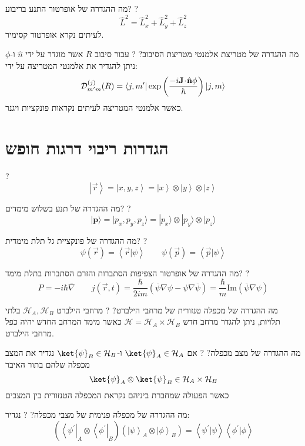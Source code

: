 \documentclass{tstextbook}
\begin{document}
מה ההגדרה של אופרטור התנע בריבוע?
?
$$\hat{L}^{2}=\hat{L}_{x}^{2}+\hat{L}_{y}^{2}+\hat{L}_{z}^{2}$$
לעיתים נקרא אופרטור קסימיר.

מה ההגדרה של מטריצת אלמנטי מטריצת הסיבוב?
?
עבור סיבוב \(R\) אשר מוגדר על ידי \(\hat{n}\) ו-\(\phi\) ניתן להגדיר את אלמנטי המטריצה על ידי:
$${\mathcal{D}}_{m^{\prime}m}^{(j)}(R)=\langle j,m^{\prime}|\exp\left(\frac{-i{\bf J}\!\cdot\!{\hat{\bf n}}\phi}{\hbar}\right)|j,m\rangle$$
כאשר אלמנטי המטריצה לעיתים נקראות פונקציות ויגנר.

\section{הגדרות ריבוי דרגות חופש}

?
$$\left|\vec{r}\right\rangle=\left|x,y,z\right\rangle=\left|x\right\rangle\otimes\left|y\right\rangle\otimes\left|z\right\rangle$$

מה ההגדרה של תנע בשלוש מימדים?
?
$$|{\textbf{p}}\rangle=|p_{x},p_{y},p_{z}\rangle=|p_{x}\rangle\otimes|p_{y}\rangle\otimes|p_{z}\rangle$$

מה ההגדרה של פונקציית גל תלת מימדית?
?
$$\psi\left(\vec{r}\right)=\left\langle \vec{r}|\psi \right\rangle  \qquad \psi\left( \vec{p} \right)=\left\langle  \vec{p}|\psi  \right\rangle $$

מה ההגדרה של אופרטור הצפיפות הסתברות והזרם הסתברות בתלת מימד?
?
$$P=-i\hbar \bar{\nabla} \qquad j\left( \vec{r},t \right)={\frac{\hbar}{2i m}}\left(\overline{{{\psi}}}\nabla\psi-\psi\nabla\overline{{{\psi}}}\right)={\frac{\hbar}{m}}\mathrm{Im}\left(\overline{{{\psi}}}\nabla\psi\right)$$

מה ההגדרה של מכפלה טנזורית של מרחבי הילברט?
?
מרחבי הילברט \(\mathcal{H}_{A},\mathcal{H}_{B}\) בלתי תלויות, ניתן להגדר מרחב חדש \(\mathcal{H}=\mathcal{H}_{A}\times \mathcal{H}_{B}\) כאשר מימד המרחב החדש יהיה כפל מרחבי הילברט.

מה ההגדרה של מצב מכפלה?
?
אם \(\ket{\psi}_{A}\in \mathcal{H}_{A}\) ו-\(\ket{\psi}_{B}\in \mathcal{H}_{B}\) נגדיר את המצב מכפלה שלהם בתור האיבר
$$\ket{\psi} _{A}\otimes \ket{\psi} _{B} \in \mathcal{H}_{A}\times \mathcal{H}_{B}$$
כאשר הפעולה שמחברת ביניהם נקראת המכפלה הטנזורית בין המצבים

מה ההגדרה של מכפלה פנימית של מצבי מכפלה?
?
נגדיר:
$$\left(\left\langle\psi^{\prime}\right|_{A}\otimes\left\langle\phi^{\prime}\right|_{B}\right)\left(\left|\psi\right\rangle_{A}\otimes\left|\phi\right\rangle_{B}\right)=\left\langle\psi^{\prime}|\psi\right\rangle\left\langle\phi^{\prime}|\phi\right\rangle$$
\end{document}
